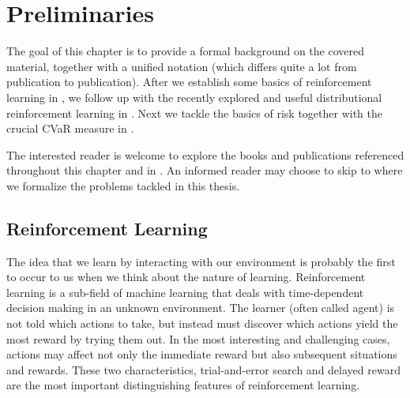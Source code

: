 \chapter{Preliminaries}\label{ch:prelim}

The goal of this chapter is to provide a formal background on the covered material, together with a unified notation (which differs quite a lot from publication to publication). After we establish some basics of reinforcement learning in , we follow up with the recently explored and useful distributional reinforcement learning in . Next we tackle the basics of risk together with the crucial CVaR measure in .

The interested reader is welcome to explore the books and publications referenced throughout this chapter and in . An informed reader may choose to skip to  where we formalize the problems tackled in this thesis.




\section{Reinforcement Learning}\label{sec:prelim:rl}

The idea that we learn by interacting with our environment is probably the first to occur to us when we think about the nature of learning. Reinforcement learning \cite{sutton1998reinforcement} is a sub-field of machine learning that deals with time-dependent decision making in an unknown environment. The learner (often called agent) is not told which actions to take, but instead must discover which actions yield the most reward by trying them out. In the most interesting and challenging cases, actions may affect not only the immediate reward but also subsequent situations and rewards. These two characteristics, trial-and-error search and delayed reward are the most important distinguishing features of reinforcement learning.

